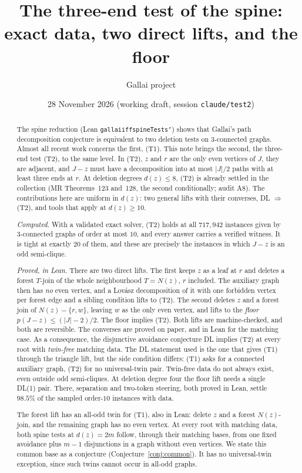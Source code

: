 \documentclass[11pt]{amsart}
\title[The three-end test]{The three-end test of the spine:\\ exact data, two direct lifts, and the floor}
\author{Gallai project}
\date{28 November 2026 (working draft, session \texttt{claude/test2})}
\theoremstyle{definition}
\theoremstyle{remark}
\renewcommand{\_}{\oldunderscore\allowbreak}
\begin{document}
\begin{abstract}
The spine reduction (Lean \texttt{gallai\_iff\_spineTests'}) shows that Gallai's path
decomposition conjecture is equivalent to two deletion tests on $3$-connected graphs. Almost all
recent work concerns the first, (T1). This note brings the second, the three-end test (T2), to the
same level. In (T2), $z$ and $r$ are the only even vertices of $J$, they are adjacent, and $J-z$
must have a decomposition into at most $|J|/2$ paths with at least three ends at $r$. At deletion
degrees $d(z)\le8$, (T2) is already settled in the collection (MR Theorems~123 and~128, the second
conditionally; audit A8). The contributions here are uniform in $d(z)$: two general lifts with
their converses, DL $\Rightarrow$ (T2), and tools that apply at $d(z)\ge10$.

\emph{Computed.} With a validated exact solver, (T2) holds at all $717{,}942$ instances given by
$3$-connected graphs of order at most $10$, and every answer carries a verified witness. It is
tight at exactly $20$ of them, and these are precisely the instances in which $J-z$ is an odd
semi-clique.

\emph{Proved, in Lean.} There are two direct lifts. The first keeps $z$ as a leaf at $r$ and deletes
a forest $T$-join of the whole neighbourhood $T=N(z)$, $r$ included. The auxiliary graph then has
\emph{no} even vertex, and a Lov\'asz decomposition of it with one forbidden vertex per forest edge
and a sibling condition lifts to (T2). The second deletes $z$ and a forest join of
$N(z)-\{r,w\}$, leaving $w$ as the only even vertex, and lifts to the \emph{floor}
$p(J-z)\le(|J|-2)/2$. The floor implies (T2). Both lifts are machine-checked, and both are
reversible. The converses are proved on paper, and in Lean for the matching case. As a
consequence, the disjunctive avoidance conjecture DL implies (T2) at every root with
\emph{twin-free} matching data. The DL statement used is the one that gives (T1) through the
triangle lift, but the side condition differs: (T1) asks for a connected auxiliary graph, (T2) for
no universal-twin pair. Twin-free data do not always exist, even outside odd semi-cliques. At deletion degree four the floor lift needs a single DL(1) pair. There,
separation and two-token steering, both proved in Lean, settle $98.5\%$ of the sampled order-$10$
instances with data.

The forest lift has an all-odd twin for (T1), also in Lean: delete $z$ and a forest $N(z)$-join, and
the remaining graph has no even vertex. At every root with matching data, both spine tests at
$d(z)=2m$ follow, through their matching bases, from one fixed avoidance plus $m-1$ disjunctions in
a graph without even vertices. We state this common base as a conjecture
(Conjecture~\ref{conj:common}). It has no universal-twin
exception, since such twins cannot occur in all-odd graphs.


\end{abstract}
\end{document}
